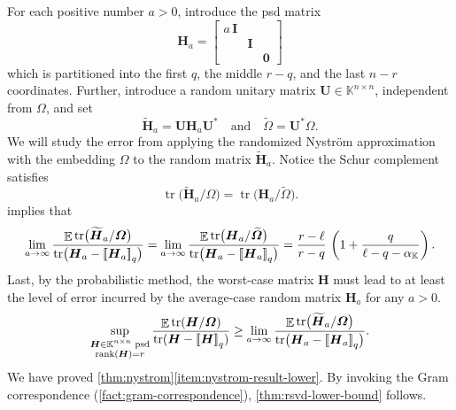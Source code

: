 \documentclass[11pt]{article}
\newcommand{\field}{\mathbb{K}}
\DeclareMathOperator{\tr}{tr}
\DeclareMathOperator{\rank}{rank}
\newcommand{\mat}[1]{\boldsymbol{#1}}
\newcommand{\lowrank}[1]{%
  \mleft[\!\mleft[ #1 \mright]\!\mright]}
\newcommand{\Id}{\mathbf{I}}
\DeclareMathOperator{\expect}{\mathbb{E}}
\renewcommand{\tilde}[1]{\widetilde{#1}}
\theoremstyle{definition}
\numberwithin{equation}{section}
\begin{document}
For each positive number $a > 0$, introduce the psd matrix
%
\begin{equation*}
    \mat{H}_a = \begin{bmatrix}
        a\,\Id & & \\
        & \Id & \\
        & & \mat{0}
    \end{bmatrix}
\end{equation*}
%
which is partitioned into the first $q$, the middle $r - q$, and the last $n - r$ coordinates.
Further, introduce a random unitary matrix $\mat{U} \in \field^{n\times n}$, independent from $\mat{\varOmega}$, and set
\begin{equation*}
    \mat{\tilde{H}}_a = \mat{U} \mat{H}_a \mat{U}^*
    \quad \text{and} \quad \mat{\tilde{\varOmega}} = \mat{U}^* \mat{\varOmega}.
\end{equation*}
We will study the error from applying the randomized Nystr\"om approximation with the embedding $\mat{\varOmega}$ to the random matrix $\mat{\tilde{H}}_a$.
Notice the Schur complement satisfies
\begin{equation*}
    \tr\bigl(\mat{\tilde{H}}_a / \mat{\varOmega}\bigr)
    = \tr\bigl( \mat{H}_a / \mat{\tilde{\varOmega}} \bigr).
\end{equation*}
 implies that
\begin{equation*}
    \lim_{a \rightarrow \infty} 
    \frac{\expect \tr\bigl(\mat{\tilde{H}}_a / \mat{\varOmega}\bigr)}{\tr\bigl(\mat{H}_a - \lowrank{\mat{H}_a}_q\bigr)} 
    = \lim_{a \rightarrow \infty} 
    \frac{\expect \tr\bigl(\mat{H}_a / \mat{\tilde{\varOmega}}\bigr)}{\tr\bigl(\mat{H}_a - \lowrank{\mat{H}_a}_q\bigr)} 
    = \frac{r-\ell}{r-q}\, \left(1 + \frac{q}{\ell - q - \alpha_\field}\right).
\end{equation*}
Last, by the probabilistic method, the worst-case matrix $\mat{H}$ must lead to at least the level of error incurred by the average-case random matrix $\mat{H}_a$ for any $a > 0$.
\begin{equation*}
    \sup_{\substack{\mat{H} \in \field^{n\times n} \text{ psd} \\ \rank(\mat{H}) = r}} \frac{\expect \tr(\mat{H} / \mat{\varOmega})}{\tr(\mat{H} - \lowrank{\mat{H}}_q)}
    \geq \lim_{a \rightarrow \infty} 
    \frac{\expect \tr\bigl(\mat{\tilde{H}}_a / \mat{\varOmega}\bigr)}{\tr\bigl(\mat{H}_a - \lowrank{\mat{H}_a}_q\bigr)} .
\end{equation*}
We have proved \cref{thm:nystrom}\ref{item:nystrom-result-lower}.
By invoking the Gram correspondence (\cref{fact:gram-correspondence}), \cref{thm:rsvd-lower-bound} follows.
\end{document}
